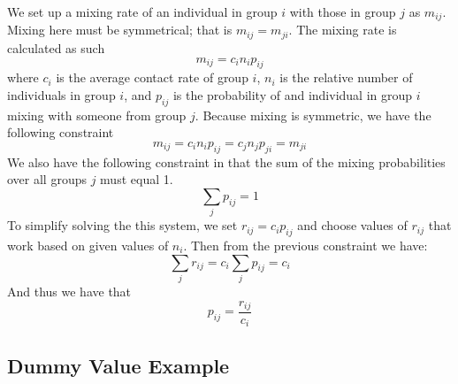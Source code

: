 \documentclass[12pt]{article}
\begin{document}
We set up a mixing rate of an individual in group $i$ with those in group $j$ as $m_{ij}$.  Mixing here must be symmetrical; that is $m_{ij}=m_{ji}$.  The mixing rate is calculated as such
\begin{equation}
m_{ij} = c_i n_i p_{ij}
\end{equation}
where $c_i$ is the average contact rate of group $i$, $n_i$ is the relative number of individuals in group $i$, and $p_{ij}$ is the probability of and individual in group $i$ mixing with someone from group $j$.  Because mixing is symmetric, we have the following constraint
\begin{equation}
m_{ij} = c_i n_i p_{ij} = c_j n_j p_{ji} = m_{ji}
\end{equation}
We also have the following constraint in that the sum of the mixing probabilities over all groups $j$ must equal 1. 
\begin{equation}
\sum_j p_{ij} = 1
\end{equation}
To simplify solving the this system, we set $r_{ij}=c_ip_{ij}$ and choose values of $r_{ij}$ that work based on given values of $n_i$.  Then from the previous constraint we have:
\begin{equation}\label{eq:ContRateEq}
\sum_j r_{ij} = c_i \sum_j p_{ij} = c_i
\end{equation}
And thus we have that 
\begin{equation}\label{eq:ProbEq}
p_{ij}=\frac{r_{ij}}{c_i}
\end{equation}

\subsection*{Dummy Value Example}
\end{document}
